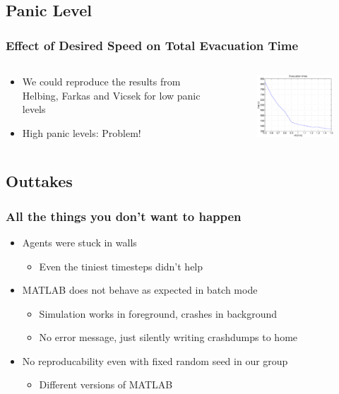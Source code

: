 \documentclass{beamer}
\begin{document}
\subsection{Panic Level}
\begin{frame}
	\frametitle{Effect of Desired Speed on Total Evacuation Time}
	\begin{columns}
		\begin{column}{5cm}
			\begin{itemize}
				\item We could reproduce the results from Helbing, Farkas and Vicsek for low panic levels
				\item High panic levels: Problem!
			\end{itemize}
		\end{column}
		\begin{column}{7cm}
			\begin{figure}
				\includegraphics[width=7cm]{images/evactimes1to11.eps}
			\end{figure}
		\end{column}
	\end{columns}
\end{frame}

\subsection{Outtakes}

\begin{frame}
	\frametitle{All the things you don't want to happen}
	\begin{itemize}
		\item Agents were stuck in walls
		\begin{itemize}
			\item Even the tiniest timesteps didn't help
		\end{itemize}
		\item MATLAB does not behave as expected in batch mode
		\begin{itemize}
			\item Simulation works in foreground, crashes in background
			\item No error message, just silently writing crashdumps to home
		\end{itemize}
		\item No reproducability even with fixed random seed in our group
		\begin{itemize}
			\item Different versions of MATLAB
		\end{itemize}
	\end{itemize}
\end{frame}
\end{document}

